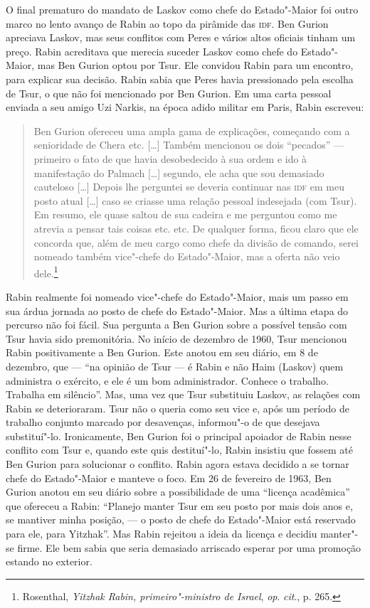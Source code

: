 O final prematuro do mandato de Laskov como chefe do Estado"-Maior foi
outro marco no lento avanço de Rabin ao topo da pirâmide das \textsc{idf}. Ben
Gurion apreciava Laskov, mas seus conflitos com Peres e vários altos
oficiais tinham um preço. Rabin acreditava que merecia suceder Laskov
como chefe do Estado"-Maior, mas Ben Gurion optou por Tsur. Ele convidou
Rabin para um encontro, para explicar sua decisão. Rabin sabia que Peres
havia pressionado pela escolha de Tsur, o que não foi mencionado por Ben
Gurion. Em uma carta pessoal enviada a seu amigo Uzi Narkis, na época
adido militar em Paris, Rabin escreveu: 

\begin{quote}
Ben Gurion ofereceu uma ampla
gama de explicações, começando com a senioridade de Chera etc. {[}\ldots{}{]}
Também mencionou os dois ``pecados'' --- primeiro o fato de que havia
desobedecido à sua ordem e ido à manifestação do Palmach {[}\ldots{}{]} segundo, ele
acha que sou demasiado cauteloso {[}\ldots{}{]} Depois lhe perguntei se deveria
continuar nas \textsc{idf} em meu posto atual {[}\ldots{}{]} caso se criasse uma relação
pessoal indesejada (com Tsur). Em resumo, ele quase saltou de sua
cadeira e me perguntou como me atrevia a pensar tais coisas etc. etc.
De qualquer forma, ficou claro que ele concorda que, além de meu cargo
como chefe da divisão de comando, serei nomeado também vice"-chefe do
Estado"-Maior, mas a oferta não veio dele.\footnote{Rosenthal, \textit{Yitzhak Rabin, primeiro"-ministro de Israel}, \textit{op}. \textit{cit}., p. 265.}
\end{quote}

Rabin realmente foi nomeado vice"-chefe do Estado"-Maior, mais um passo em
sua árdua jornada ao posto de chefe do Estado"-Maior. Mas a última etapa
do percurso não foi fácil. Sua pergunta a Ben Gurion sobre a possível
tensão com Tsur havia sido premonitória. No início de dezembro de 1960,
Tsur mencionou Rabin positivamente a Ben Gurion. Este anotou em
seu diário, em 8 de dezembro, que --- ``na opinião de Tsur --- é Rabin e não
Haim (Laskov) quem administra o exército, e ele é um bom administrador.
Conhece o trabalho. Trabalha em silêncio''. Mas, uma vez que Tsur
substituiu Laskov, as relações com Rabin se deterioraram. Tsur não o
queria como seu vice e, após um período de trabalho conjunto marcado por
desavenças, informou"-o de que desejava substituí"-lo. Ironicamente, Ben
Gurion foi o principal apoiador de Rabin nesse conflito com Tsur e,
quando este quis destituí"-lo, Rabin insistiu que fossem até Ben Gurion
para solucionar o conflito. Rabin agora estava decidido a se tornar
chefe do Estado"-Maior e manteve o foco. Em 26 de fevereiro de 1963, Ben
Gurion anotou em seu diário sobre a possibilidade de uma ``licença
acadêmica'' que ofereceu a Rabin: ``Planejo manter Tsur em
seu posto por mais dois anos e, se mantiver minha posição, --- o posto de
chefe do Estado"-Maior está reservado para ele, para Yitzhak''. Mas Rabin
rejeitou a ideia da licença e decidiu manter"-se firme. Ele bem sabia que
seria demasiado arriscado esperar por uma promoção estando no exterior.

